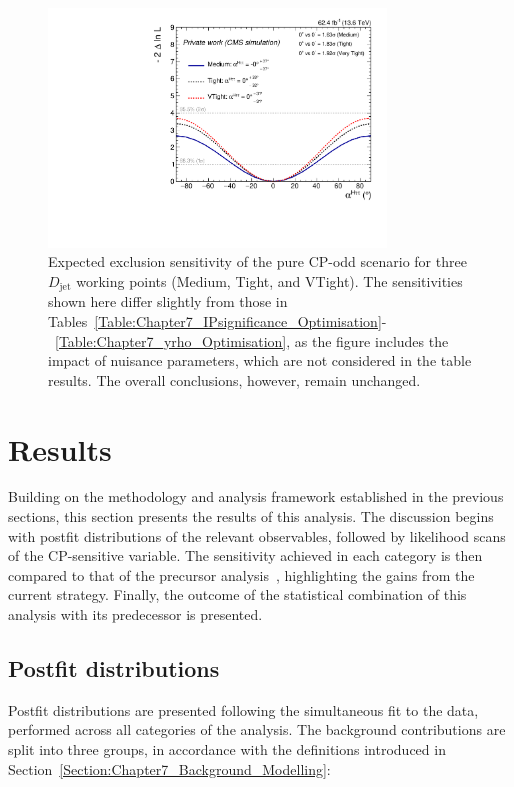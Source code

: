 \begin{figure}[!htbp]
    \centering
    \includegraphics[width=0.8\textwidth]{Figures/Chapter7/alpha/alpha_WP.pdf}
    \caption[Expected sensitivity scan for different $D_{\text{jet}}$ working points.]
    {Expected exclusion sensitivity of the pure CP-odd scenario for three $D_{\text{jet}}$ working points (Medium, Tight, and VTight). The sensitivities shown here differ slightly from those in Tables~\ref{Table:Chapter7_IPsignificance_Optimisation}-~\ref{Table:Chapter7_yrho_Optimisation}, as the figure includes the impact of nuisance parameters, which are not considered in the table results. The overall conclusions, however, remain unchanged.}
    \label{Figure:Chapter7_WP_Optimisation}
\end{figure}

\section{Results}

Building on the methodology and analysis framework established in the previous sections, this section presents the results of this analysis. The discussion begins with postfit distributions of the relevant observables, followed by likelihood scans of the CP-sensitive variable. The sensitivity achieved in each category is then compared to that of the precursor analysis~\cite{HiggsCP_CMS_2021}, highlighting the gains from the current strategy. Finally, the outcome of the statistical combination of this analysis with its predecessor is presented.

\subsection{Postfit distributions}

Postfit distributions are presented following the simultaneous fit to the data, performed across all categories of the analysis. The background contributions are split into three groups, in accordance with the definitions introduced in Section~\ref{Section:Chapter7_Background_Modelling}:


